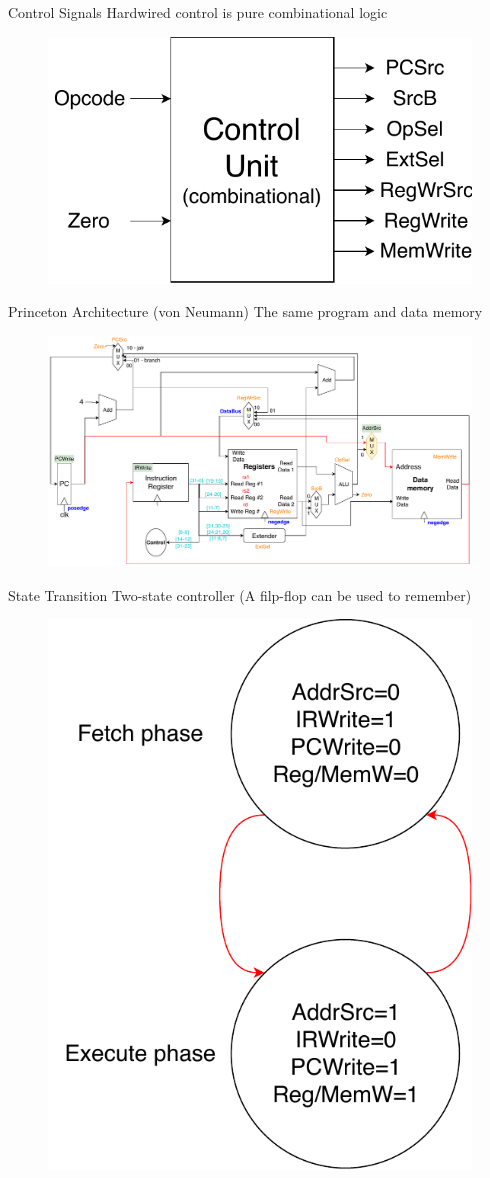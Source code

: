 \documentclass[UTF8]{ctexbeamer}
\begin{document}
\begin{frame}{Control Signals}
Hardwired control is pure combinational logic
\begin{figure}
\centering
\includegraphics[width=0.5\linewidth]{fig/Lecture2/Datapath-Control-signals.pdf}
\end{figure}
\end{frame}

\begin{frame}{Princeton Architecture (von Neumann)}
The same program and data memory
\begin{figure}
\centering
\includegraphics[width=\linewidth]{fig/Lecture2/Datapath-Princeton.pdf}
\end{figure}
\end{frame}

\begin{frame}{State Transition}
Two-state controller (A filp-flop can be used to remember)
\begin{figure}
\centering
\includegraphics[width=0.4\linewidth]{fig/Lecture2/Datapath-State.pdf}
\end{figure}
\end{frame}
\end{document}
